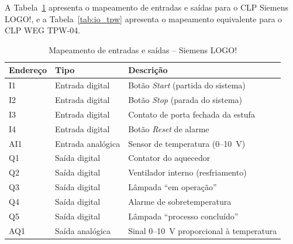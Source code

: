 \documentclass[
  12pt,
  openright,
  oneside,
  a4paper,
  chapter=TITLE,
  section=TITLE,
  brazilian
]{abntex2}
\begin{document}
A Tabela~\ref{tab:io_logo} apresenta o mapeamento de entradas e sa\'{i}das para o CLP Siemens LOGO!, e a Tabela~\ref{tab:io_tpw} apresenta o mapeamento equivalente para o CLP WEG TPW-04.

\begin{table}[htbp]
\centering
\caption{Mapeamento de entradas e sa\'{i}das -- Siemens LOGO!}
\label{tab:io_logo}
\begin{tabular}{llp{7.5cm}}
\toprule
\textbf{Endere\c{c}o} & \textbf{Tipo} & \textbf{Descri\c{c}\~{a}o} \\
\midrule
I1   & Entrada digital  & Bot\~{a}o \textit{Start} (partida do sistema) \\
I2   & Entrada digital  & Bot\~{a}o \textit{Stop} (parada do sistema) \\
I3   & Entrada digital  & Contato de porta fechada da estufa \\
I4   & Entrada digital  & Bot\~{a}o \textit{Reset} de alarme \\
AI1  & Entrada anal\'{o}gica & Sensor de temperatura (0--10~V) \\
Q1   & Sa\'{i}da digital    & Contator do aquecedor \\
Q2   & Sa\'{i}da digital    & Ventilador interno (resfriamento) \\
Q3   & Sa\'{i}da digital    & L\^{a}mpada ``em opera\c{c}\~{a}o'' \\
Q4   & Sa\'{i}da digital    & Alarme de sobretemperatura \\
Q5   & Sa\'{i}da digital    & L\^{a}mpada ``processo conclu\'{i}do'' \\
AQ1  & Sa\'{i}da anal\'{o}gica  & Sinal 0--10~V proporcional \`{a} temperatura \\
\bottomrule
\end{tabular}
\end{table}
\end{document}

